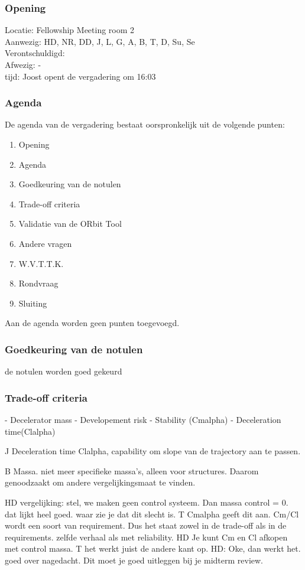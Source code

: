 \subsubsection{Opening}
Locatie: Fellowship Meeting room 2\\
Aanwezig: HD, NR, DD, J, L, G, A, B, T, D, Su, Se\\
Verontschuldigd: \\
Afwezig: - \\
tijd: Joost opent de vergadering om 16:03\\

\subsubsection{Agenda}
De agenda van de vergadering bestaat oorspronkelijk uit de volgende punten:
\begin{enumerate}
\item Opening
\item Agenda
\item Goedkeuring van de notulen
\item Trade-off criteria
\item Validatie van de ORbit Tool
\item Andere vragen
\item W.V.T.T.K.
\item Rondvraag
\item Sluiting
\end{enumerate}

Aan de agenda worden geen punten toegevoegd.

\subsubsection{Goedkeuring van de notulen}
de notulen worden goed gekeurd

\subsubsection{Trade-off criteria}
- Decelerator mass
- Developement risk
- Stability (Cmalpha)
- Deceleration time(Clalpha)

J Deceleration time Clalpha, capability om slope van de trajectory aan te passen. 

B Massa. niet meer specifieke massa's, alleen voor structures. Daarom genoodzaakt om andere vergelijkingsmaat te vinden. 

HD vergelijking: stel, we maken geen control systeem. Dan massa control = 0. dat lijkt heel goed. waar zie je dat dit slecht is. T Cmalpha geeft dit aan. Cm/Cl wordt een soort van requirement. Dus het staat zowel in de trade-off als in de requirements. zelfde verhaal als met reliability. HD Je kunt Cm en Cl afkopen met control massa. T het werkt juist de andere kant op. HD: Oke, dan werkt het. goed over nagedacht. Dit moet je goed uitleggen bij je midterm review. 

